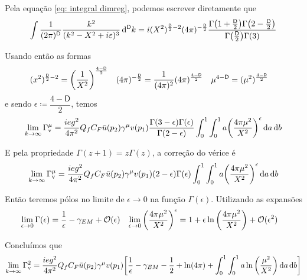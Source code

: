 Pela equação \eqref{eq: integral dimreg}, podemos escrever diretamente que
    \begin{equation*}
        \int \dfrac{1}{(2\pi)^{\mathsf{D}}}\dfrac{k^{2}}{(k^{2} - X^{2} + i\varepsilon)^{3}}\dd[\mathsf{D}]{k} = i(X^{2})^{\frac{\mathsf{D}}{2}-2} (4\pi)^{-\frac{\mathsf{D}}{2}} \dfrac{\Gamma\qty(1+\frac{\mathsf{D}}{2}) \Gamma\qty(2-\frac{\mathsf{D}}{2})}{\Gamma\qty(\frac{\mathsf{D}}{2})\Gamma(3)}
    \end{equation*}

Usando então as formas
    \begin{align*}
        (x^{2})^{\frac{\mathsf{D}}{2}-2} &= \qty(\dfrac{1}{X^{2}})^{\frac{4-\mathsf{D}}{2}} & 
        (4\pi)^{-\frac{\mathsf{D}}{2}} &= \dfrac{1}{(4\pi)^{2}}(4\pi)^{\frac{4-\mathsf{D}}{2}} &
        \mu^{4-\mathsf{D}} &= (\mu^{2})^{\frac{4-\mathsf{D}}{2}}
    \end{align*}
e sendo $\epsilon \coloneqq \dfrac{4 - \mathsf{D}}{2}$, temos
    \begin{equation*}
        \lim_{k\to\infty}\Gamma_{\text{v}}^{\mu} = \dfrac{ieg^{2}}{4\pi^{2}} Q_{f}C_{F}\bar{u}(p_{2}) \gamma^{\mu} v(p_{1}) \dfrac{\Gamma(3-\epsilon)\Gamma(\epsilon)}{\Gamma(2-\epsilon)} \int_{0}^{1}\int_{0}^{1} a\qty(\dfrac{4\pi\mu^{2}}{X^{2}})^{\epsilon}\dd{a}\dd{b}
    \end{equation*}

E pela propriedade $\Gamma(z+1) = z\Gamma(z)$, a correção do vérice é 
    \begin{equation*}
        \lim_{k\to\infty}\Gamma_{\text{v}}^{\mu} = \dfrac{ieg^{2}}{4\pi^{2}} Q_{f}C_{F}\bar{u}(p_{2}) \gamma^{\mu} v(p_{1}) (2-\epsilon)\Gamma(\epsilon) \int_{0}^{1}\int_{0}^{1} a\qty(\dfrac{4\pi\mu^{2}}{X^{2}})^{\epsilon}\dd{a}\dd{b}
    \end{equation*}

Então teremos pólos no limite de $\epsilon\to0$ na função $\Gamma(\epsilon)$. Utilizando as expansões 
    \begin{align*}
        \lim_{\epsilon\to0}\Gamma(\epsilon) &= \dfrac{1}{\epsilon} - \gamma_{EM} + \mathcal{O}(\epsilon) & 
        \lim_{\epsilon\to0}\qty(\dfrac{4\pi\mu^{2}}{X^{2}})^{\epsilon} &= 1 + \epsilon\ln\qty(\dfrac{4\pi\mu^{2}}{X^{2}}) + \mathcal{O}(\epsilon^{2})
    \end{align*}

Concluímos que 
    \begin{equation*}
        \lim_{k\to\infty}\Gamma_{\text{v}}^{2} = \dfrac{ieg^{2}}{4\pi^{2}}Q_{f}C_{F}\bar{u}(p_{2})\gamma^{\mu}v(p_{1})\qty[
            \dfrac{1}{\epsilon} - 
            \gamma_{EM} - 
            \dfrac{1}{2} + 
            \ln(4\pi) +
            \int_{0}^{1} \int_{0}^{1} a\ln\qty(\dfrac{\mu^{2}}{X^{2}})\dd{a}\dd{b}
        ]
    \end{equation*}

